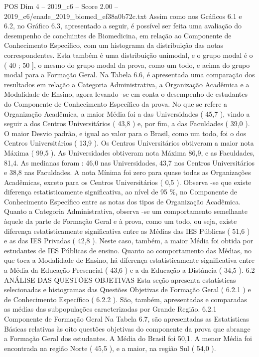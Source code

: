 \begin{textsample}{POS Dim 4 – 2019\_c6 – Score 2.00 – 2019\_c6/enade\_2019\_biomed\_ef38a0b72c.txt}
Assim como nos Gráficos 6.1 e 6.2, no Gráfico 6.3, apresentado a seguir, é possível ser feita uma avaliação do desempenho de concluintes de Biomedicina, em relação ao Componente de Conhecimento Específico, com um histograma da distribuição das notas correspondentes.
Esta também é uma distribuição unimodal, e o grupo modal é o ( 40 ; 50 ], o mesmo do grupo modal da prova, como um todo, e acima do grupo modal para a Formação Geral.
Na Tabela 6.6, é apresentada uma comparação dos resultados em relação a Categoria Administrativa, a Organização Acadêmica e a Modalidade de Ensino, agora levando -se em conta o desempenho de estudantes do Componente de Conhecimento Específico da prova.
No que se refere a Organização Acadêmica, a maior Média foi a das Universidades ( 45,7 ), vindo a seguir a dos Centros Universitários ( 43,8 ) e, por fim, a das Faculdades ( 39,0 ).
O maior Desvio padrão, e igual ao valor para o Brasil, como um todo, foi o dos Centros Universitários ( 13,9 ).
Os Centros Universitários obtiveram a maior nota Máxima ( 99,5 ).
As Universidades obtiveram nota Máxima 86,9, e as Faculdades, 81,4.
As medianas foram : 46,0 nas Universidades, 43,7 nos Centros Universitários e 38,8 nas Faculdades.
A nota Mínima foi zero para quase todas as Organizações Acadêmicas, exceto para os Centros Universitários ( 0,5 ).
Observa -se que existe diferença estatisticamente significativa, ao nível de 95 \%, no Componente de Conhecimento Específico entre as notas dos tipos de Organização Acadêmica.
Quanto a Categoria Administrativa, observa -se um comportamento semelhante àquele da parte de Formação Geral e à prova, como um todo, ou seja, existe diferença estatisticamente significativa entre as Médias das IES Públicas ( 51,6 ) e as das IES Privadas ( 42,8 ).
Neste caso, também, a maior Média foi obtida por estudantes de IES Públicas de ensino.
Quanto ao comportamento das Médias, no que toca a Modalidade de Ensino, há diferença estatisticamente significativa entre a Média da Educação Presencial ( 43,6 ) e a da Educação a Distância ( 34,5 ). 6.2 ANÁLISE DAS QUESTÕES OBJETIVAS Esta seção apresenta estatísticas selecionadas e histogramas das Questões Objetivas de Formação Geral ( 6.2.1 ) e de Conhecimento Específico ( 6.2.2 ).
São, também, apresentadas e comparadas as médias das subpopulações caracterizadas por Grande Região. 6.2.1 Componente de Formação Geral Na Tabela 6.7, são apresentadas as Estatísticas Básicas relativas às oito questões objetivas do componente da prova que abrange a Formação Geral dos estudantes.
A Média do Brasil foi 50,1.
A menor Média foi encontrada na região Norte ( 45,5 ), e a maior, na região Sul ( 54,0 ).

\end{textsample}
